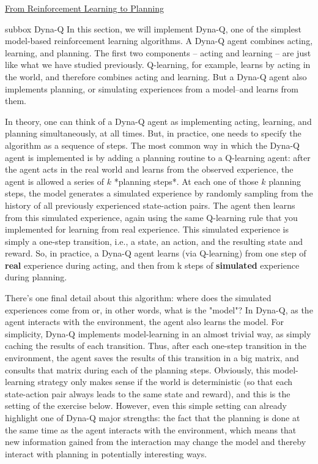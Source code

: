 \begin{textbox}{\href{https://compneuro.neuromatch.io/tutorials/W3D4_ReinforcementLearning/student/W3D4_Tutorial4.html}{From Reinforcement Learning to Planning } }

\begin{subbox}{subbox}{ Dyna-Q}
\scriptsize
In this section, we will implement Dyna-Q, one of the simplest model-based reinforcement learning algorithms. A Dyna-Q agent combines acting, learning, and planning. The first two components -- acting and learning -- are just like what we have studied previously. Q-learning, for example, learns by acting in the world, and therefore combines acting and learning. But a Dyna-Q agent also implements planning, or simulating experiences from a model--and learns from them. 

In theory, one can think of a Dyna-Q agent as implementing acting, learning, and planning simultaneously, at all times. But, in practice, one needs to specify the algorithm as a sequence of steps. The most common way in which the Dyna-Q agent is implemented is by adding a planning routine to a Q-learning agent: after the agent acts in the real world and learns from the observed experience, the agent is allowed a series of $k$ *planning steps*. At each one of those $k$ planning steps, the model generates a simulated experience by randomly sampling from the history of all previously experienced state-action pairs. The agent then learns from this simulated experience, again using the same Q-learning rule that you implemented for learning from real experience. This simulated experience is simply a one-step transition, i.e., a state, an action, and the resulting state and reward. So, in practice, a Dyna-Q agent learns (via Q-learning) from one step of \textbf{real} experience during acting, and then from k steps of \textbf{simulated} experience during planning.

There's one final detail about this algorithm: where does the simulated experiences come from or, in other words, what is the "model"? In Dyna-Q, as the agent interacts with the environment, the agent also learns the model. For simplicity, Dyna-Q implements model-learning in an almost trivial way, as simply caching the results of each transition. Thus, after each one-step transition in the environment, the agent saves the results of this transition in a big matrix, and consults that matrix during each of the planning steps. Obviously, this model-learning strategy only makes sense if the world is deterministic (so that each state-action pair always leads to the same state and reward), and this is the setting of the exercise below. However, even this simple setting can already highlight one of Dyna-Q major strengths: the fact that the planning is done at the same time as the agent interacts with the environment, which means that new information gained from the interaction may change the model and thereby interact with planning in potentially interesting ways.

\end{subbox}
\end{textbox}
